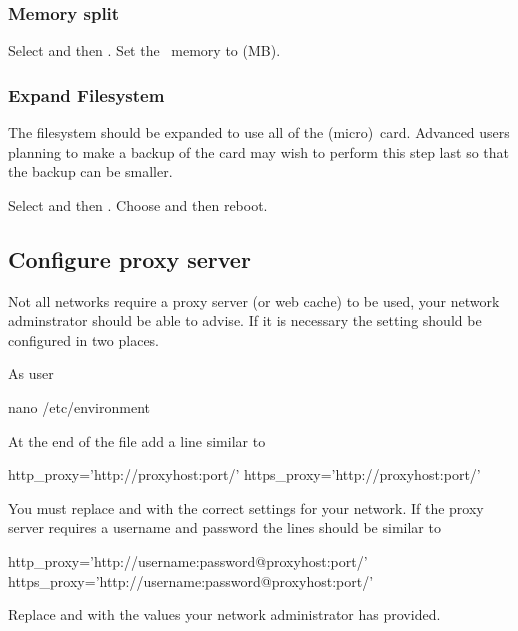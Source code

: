 
\subsubsection{Memory split}
Select  and then . Set the \gpu\ memory to  (MB).

\subsubsection{Expand Filesystem}
The filesystem should be expanded to use all of the (micro)\sd\
card. Advanced users planning to make a backup of the card may wish to
perform this step last so that the backup can be smaller.

Select  and then . Choose 
\code{Finish} and then reboot.


\subsection{Configure proxy server}
Not all networks require a proxy server (or web cache) to be used,
your network adminstrator should be able to advise. If it is necessary
the setting should be configured in two places.

As user \rootUser
\begin{Cmd}
nano /etc/environment  
\end{Cmd}

At the end of the file add a line similar to
\begin{Cmd}
http_proxy='http://proxyhost:port/'
https_proxy='http://proxyhost:port/'
\end{Cmd}
You must replace  and  with the correct
settings for your network. If the proxy server requires a username and
password the lines should be similar to
\begin{Cmd}
http_proxy='http://username:password@proxyhost:port/'
https_proxy='http://username:password@proxyhost:port/'
\end{Cmd}
Replace  and  with the values your
network administrator has provided.

